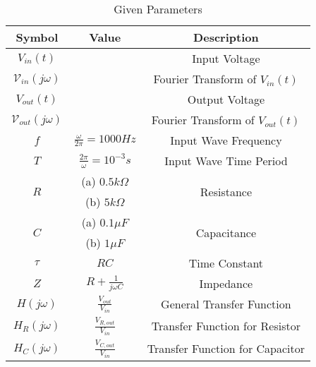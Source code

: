 \begin{table}[!h]
    \centering
    \begin{tabular}{|c|c|c|}
    \hline
       \textbf{Symbol}  & \textbf{Value} &  \textbf{Description}\\
    \hline
       $V_{in}(t)$  &  &  Input Voltage\\
    \hline
        $\mathcal{V}_{in}(j\omega)$ & & Fourier Transform of $V_{in}(t)$\\
    \hline
        $V_{out}(t)$ & & Output Voltage\\
    \hline
        $\mathcal{V}_{out}(j\omega)$ & & Fourier Transform of $V_{out}(t)$\\
    \hline
        $f$ & $\frac{\omega}{2\pi} = 1000Hz$ & Input Wave Frequency\\
    \hline
        $T$ & $\frac{2\pi}{\omega} = 10^{-3} s$ & Input Wave Time Period\\
    \hline
        \multirow{2}{*}{$R$} & (a) $0.5k\Omega$ & \multirow{2}{*}{Resistance}\\
        \cline{2-2}
        & (b) $5k\Omega$ &\\
        \cline{2-2}
    \hline
        \multirow{2}{*}{$C$} & (a) $0.1\mu F$ & \multirow{2}{*}{Capacitance}\\
        \cline{2-2}
        & (b) $1\mu F$ &\\
        \cline{2-2}
    \hline
        $\tau$ & $RC$ & Time Constant\\
    \hline
        $Z$ & $R + \frac{1}{j\omega C}$ & Impedance\\
    \hline
        $H(j\omega)$ & $\frac{V_{out}}{V_{in}}$ & General Transfer Function\\
    \hline
        $H_{R}(j\omega)$ & $\frac{V_{R, out}}{V_{in}}$ & Transfer Function for Resistor\\
    \hline
        $H_{C}(j\omega)$ & $\frac{V_{C, out}}{V_{in}}$ & Transfer Function for Capacitor\\
    \hline
    \end{tabular}
    \caption{Given Parameters}
    \label{tab:1_gate.23.ph.37}
\end{table}
